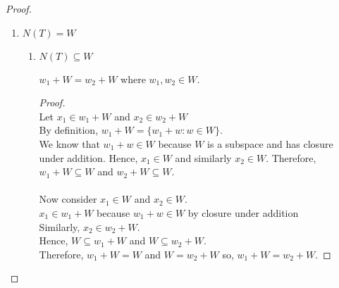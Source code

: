 \documentclass[11pt]{scrartcl}
\begin{document}
\begin{enumerate}[label=\alph*.]
{\begin{proof}
\begin{enumerate}[label=\arabic*.]
{\begin{enumerate}[label=\roman*.]
{				                  }
			            \end{enumerate}
			            }
			      \item{
			            $N(T) = W$
			            \begin{enumerate}[label=\roman*.]
				            \item{
								  $N(T) \subseteq W$
								  \begin{lemma}
									$w_1 + W = w_2 + W$ where $w_1, w_2 \in W$.
									\begin{proof}\-\\
										Let $x_1 \in w_1 + W$ and $x_2 \in w_2 + W$\\
										By definition, $w_1 + W = \{w_1 + w : w \in W\}$.\\
										We know that $w_1 +w \in W$ because $W$ is a subspace and has closure under addition.
										Hence, $x_1 \in W$ and similarly $x_2 \in W$. Therefore, $w_1 + W \subseteq W$ and  $w_2 + W \subseteq W$.\\\-\\
										Now consider $x_1 \in W$ and $x_2 \in W$.\\
										$x_1 \in w_1 + W$ because $w_1 + w \in W$ by closure under addition\\
										Similarly, $x_2 \in w_2 + W$.\\
										Hence, $W \subseteq w_1 + W$ and $W \subseteq w_2 + W$.\\

										Therefore, $w_1 + W = W$ and $W = w_2 + W$ so, $w_1 + W = w_2 + W $. 


\end{proof}
\end{lemma}}
\end{enumerate}}
\end{enumerate}
\end{proof}}
\end{enumerate}
\end{document}
